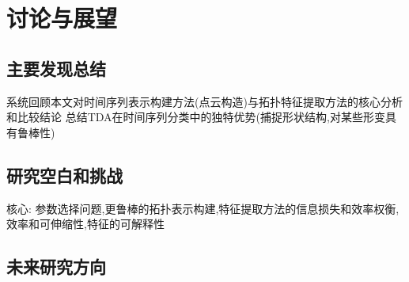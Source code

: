 \section{讨论与展望}
\subsection{主要发现总结}
系统回顾本文对时间序列表示构建方法(点云构造)与拓扑特征提取方法的核心分析和比较结论
总结TDA在时间序列分类中的独特优势(捕捉形状结构,对某些形变具有鲁棒性)

\subsection{研究空白和挑战}
核心: 参数选择问题,更鲁棒的拓扑表示构建,特征提取方法的信息损失和效率权衡,
效率和可伸缩性,特征的可解释性

\subsection{未来研究方向}

